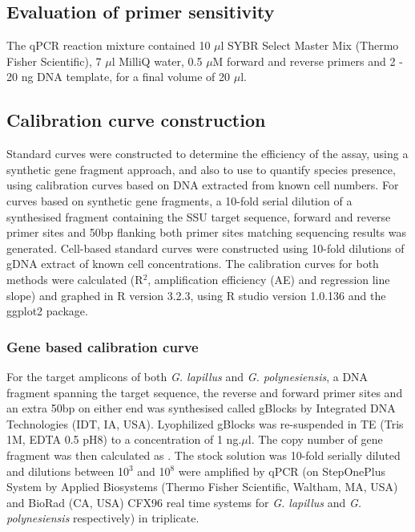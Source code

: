 \documentclass[12pt]{article}
\begin{document}
\subsection*{Evaluation of primer sensitivity}
The qPCR reaction mixture contained 10 $\mu$l SYBR Select Master Mix (Thermo Fisher Scientific), 7 $\mu$l MilliQ water, 0.5 $\mu$M forward and reverse primers and 2 - 20 ng DNA template, for a final volume of 20 $\mu$l.
\subsection*{Calibration curve construction}
Standard curves were constructed to determine the efficiency of the assay, using a synthetic gene fragment approach, and also to use to quantify species presence, using calibration curves based on DNA extracted from known cell numbers. For curves based on synthetic gene fragments, a 10-fold serial dilution of a synthesised fragment containing the SSU target sequence, forward and reverse primer sites and 50bp flanking both primer sites matching sequencing results was generated. Cell-based standard curves were constructed using 10-fold dilutions of gDNA extract of known cell concentrations.
The calibration curves for both methods were calculated (R$^{2}$, amplification efficiency (AE) and regression line slope) and graphed in R version 3.2.3, using R studio version 1.0.136 and the ggplot2 package. 
\subsubsection*{Gene based calibration curve}
For the target amplicons of both \emph{G. lapillus} and \emph{G. polynesiensis}, a DNA fragment spanning the target sequence, the reverse and forward primer sites and an extra 50bp on either end was synthesised called gBlocks \textsuperscript{\textregistered} by Integrated DNA Technologies (IDT, IA, USA). Lyophilized gBlocks \textsuperscript{\textregistered} was re-suspended in TE (Tris 1M, EDTA 0.5 pH8) to a concentration of 1 ng.$\mu$l. The copy number of gene fragment was then {\Large calculated as }.
The stock solution was 10-fold serially diluted and dilutions between 10$^{3}$ and 10$^{8}$ were amplified by qPCR (on StepOnePlus System by Applied Biosystems (Thermo Fisher Scientific, Waltham, MA, USA) and BioRad (CA, USA) CFX96 real time systems for \emph{G. lapillus} and \emph{G. polynesiensis} respectively) in triplicate.


\end{document}
